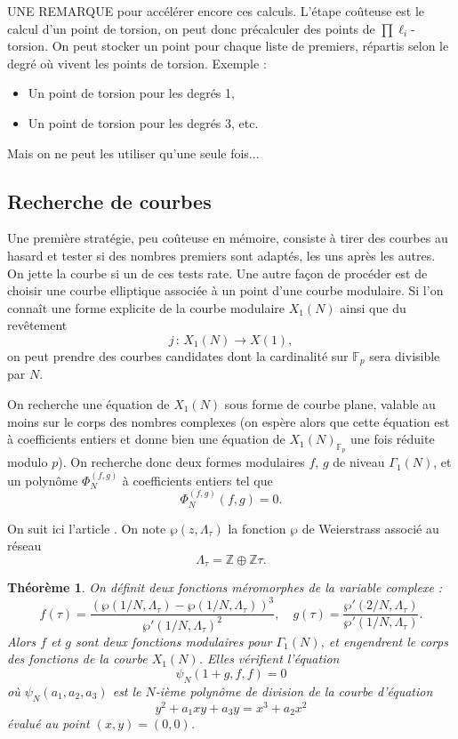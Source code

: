 \documentclass[11pt,a4paper]{article}
\newcommand{\Z}{\mathbb{Z}}
\newcommand{\F}{\mathbb{F}}
\newcommand{\vers}{\longrightarrow}
\newcommand{\de}{\,:\,}
\newtheorem*{thm}{Théorème}
\theoremstyle{definition}
\begin{document}
UNE REMARQUE pour accélérer encore ces calculs. L'étape coûteuse est le calcul d'un point de torsion, on peut donc précalculer des points de $\prod \ell_i$-torsion. On peut stocker un point pour chaque liste de premiers, répartis selon le degré où vivent les points de torsion.
Exemple :
\begin{itemize}
\item Un point de torsion pour les degrés 1,
\item Un point de torsion pour les degrés 3,
etc.
\end{itemize}

Mais on ne peut les utiliser qu'une seule fois...


\subsection{Recherche de courbes}

Une première stratégie, peu coûteuse en mémoire, consiste à tirer des courbes au hasard et tester si des nombres premiers sont adaptés, les uns après les autres. On jette la courbe si un de ces tests rate. Une autre façon de procéder est de choisir une courbe elliptique associée à un point d'une courbe modulaire. Si l'on connaît une forme explicite de la courbe modulaire $X_1(N)$ ainsi que du revêtement
$$j\de X_1(N)\vers X(1),$$
on peut prendre des courbes candidates dont la cardinalité sur $\F_p$ sera divisible par $N$.

On recherche une équation de $X_1(N)$ sous forme de courbe plane, valable au moins sur le corps des nombres complexes (on espère alors que cette équation est à coefficients entiers et donne bien une équation de $X_1(N)_{\F_p}$ une fois réduite modulo $p$). On recherche donc deux formes modulaires $f$, $g$ de niveau $\Gamma_1(N)$, et un polynôme $\Phi_N^{(f, g)}$ à coefficients entiers tel que
$$\Phi_N^{(f, g)}(f, g) = 0.$$

On suit ici l'article \cite{Baaziz}. On note $\wp(z, \Lambda_\tau)$ la fonction $\wp$ de Weierstrass associé au réseau
$$\Lambda_\tau = \Z\oplus\Z \tau.$$

\begin{thm}
On définit deux fonctions méromorphes de la variable complexe :
$$f(\tau) = \frac{(\wp(1/N, \Lambda_\tau) - \wp(1/N, \Lambda_\tau))^3}{\wp'(1/N, \Lambda_\tau)^2}, \quad
g(\tau) = \frac{\wp'(2/N, \Lambda_\tau)}{\wp'(1/N,\Lambda_\tau)}.$$
Alors $f$ et $g$ sont deux fonctions modulaires pour $\Gamma_1(N)$, et engendrent le corps des fonctions de la courbe $X_1(N)$. Elles vérifient l'équation
$$\psi_N(1+g, f, f) = 0$$
où $\psi_N(a_1, a_2, a_3)$ est le $N$-ième polynôme de division de la courbe d'équation
$$y^2 + a_1xy + a_3y = x^3 + a_2x^2$$
évalué au point $(x, y) = (0, 0)$.
\end{thm}
\end{document}
